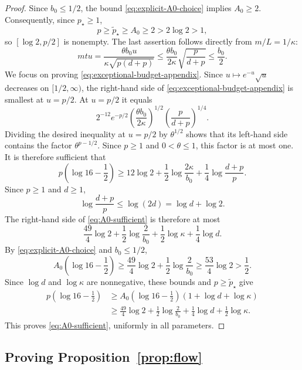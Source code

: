 \documentclass[11pt]{article}
\newcommand{\1}{\mathbf 1}
\begin{document}
	\begin{proof}
		Since \(b_0\leq1/2\), the bound
		\eqref{eq:explicit-A0-choice} implies \(A_0\geq2\).
		Consequently, since \(p_\star\geq1\),
		\[
		p\geq\widetilde p_\star\geq A_0\geq2>2\log2>1,
		\]
		so \([\log2,p/2]\) is nonempty.
		The last assertion follows directly from \(m/L=1/\kappa\):
		\[
		mtu
		=\frac{\theta b_0u}{\kappa\sqrt{p(d+p)}}
		\leq
		\frac{\theta b_0}{2\kappa}
		\sqrt{\frac{p}{d+p}}
		\leq\frac{b_0}{2}.
		\]
		We focus on proving \eqref{eq:exceptional-budget-appendix}.
		Since \(u\mapsto e^{-u}\sqrt{u}\) decreases on \([1/2,\infty)\), the
		right-hand side of \eqref{eq:exceptional-budget-appendix} is smallest at
		\(u=p/2\).  At $u=p/2$ it equals
		\[
		 2^{-12} e^{-p/2}
		\left(\frac{\theta b_0}{2\kappa}\right)^{1/2}
		\left(\frac{p}{d+p}\right)^{1/4}.
		\]
		Dividing the desired inequality at \(u=p/2\) by
		\(\theta^{1/2}\) shows that its left-hand side contains the factor
		\(\theta^{p-1/2}\).  Since \(p\geq1\) and \(0<\theta\leq1\), this
		factor is at most one.  It is therefore sufficient that
		\begin{equation}\label{eq:A0-sufficient}
			p\left(\log 16-\frac12\right)
			\geq
			12 \log 2
			+\frac12\log\frac{2\kappa}{b_0}
			+\frac14\log\frac{d+p}{p}.
		\end{equation}
		Since \(p\geq1\) and \(d\geq1\),
		\[
		\log\frac{d+p}{p}\leq\log(2d)=\log d+\log2.
		\]
		The right-hand side of \eqref{eq:A0-sufficient} is therefore at most
		\[
		 \frac{49}{4} \log 2+\frac12\log\frac{2}{b_0}
		+\frac12\log\kappa+\frac14\log d.
		\]
		By \eqref{eq:explicit-A0-choice} and \(b_0\leq1/2\),
		\[
		A_0\left(\log16-\frac12\right)
		\geq \frac{49}{4} \log2+\frac12\log \frac{2}{b_0}
		\geq \frac{53}{4} \log2>\frac12.
		\]
		Since \(\log d\) and \(\log\kappa\) are nonnegative, these
		bounds and \(p\geq  \widetilde p_\star \) give
		\begin{align*}
			p\left(\log16-\frac12\right)
			&\geq A_0\left(\log16-\frac12\right)
			(1+\log d+\log\kappa)\\
			&\geq \frac{49}{4} \log2+\frac12\log \frac{2}{b_0}
			+\frac14\log d+\frac12\log\kappa.
		\end{align*}
		This proves \eqref{eq:A0-sufficient}, uniformly in all parameters.
	\end{proof}
	
	\subsection{Proving Proposition~\ref{prop:flow}}
	
\end{document}
